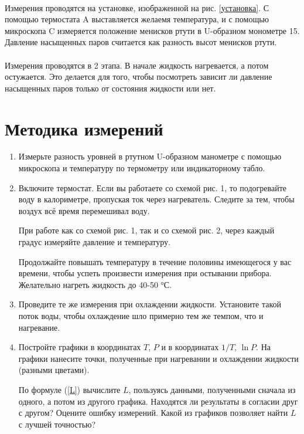 \documentclass[a4paper,12pt]{article} %
\begin{document}
\paragraph{}
Измерения проводятся на установке, изображенной на рис. \ref{установка}. С помощью термостата A выставляется желаемя температура, и с помощью микроскопа C измеряется положение менисков ртути в U-образном монометре 15. Давление насыщенных паров считается как разность высот менисков ртути.
\paragraph{}
Измерения проводятся в 2 этапа. В начале жидкость нагревается, а потом остужается. Это делается для того, чтобы посмотреть зависит ли давление насыщенных паров только от состояния жидкости или нет.

\section{Методика измерений}

\begin{enumerate}

    \item
    Измерьте разность уровней в ртутном U-образном манометре с помощью микроскопа и температуру по термометру или индикаторному табло.

    \item
    Включите термостат. Если вы работаете со схемой рис. 1, то подогревайте воду в калориметре, пропуская ток через нагреватель. Следите за тем, чтобы воздух всё время перемешивал воду.

    При работе как со схемой рис. 1, так и со схемой рис. 2, через каждый градус измеряйте давление и температуру.

    Продолжайте повышать температуру в течение половины имеющегося у вас времени, чтобы успеть произвести измерения при остывании прибора. Желательно нагреть жидкость до 40-50 °С.

    \item
    Проведите те же измерения при охлаждении жидкости. Установите такой поток воды, чтобы охлаждение шло примерно тем же темпом, что и нагревание.

    \item
    Постройте графики в координатах $T$, $P$ и в координатах $1/T$, $\ln{P}$. На графики нанесите точки, полученные при нагревании и охлаждении жидкости (разными цветами).

    По формуле (\ref{L}) вычислите $L$, пользуясь данными, полученными сначала из одного, а потом из другого графика. Находятся ли результаты в согласии друг с другом? Оцените ошибку измерений. Какой из графиков позволяет найти $L$ с лучшей точностью?

\end{enumerate}
\end{document}
